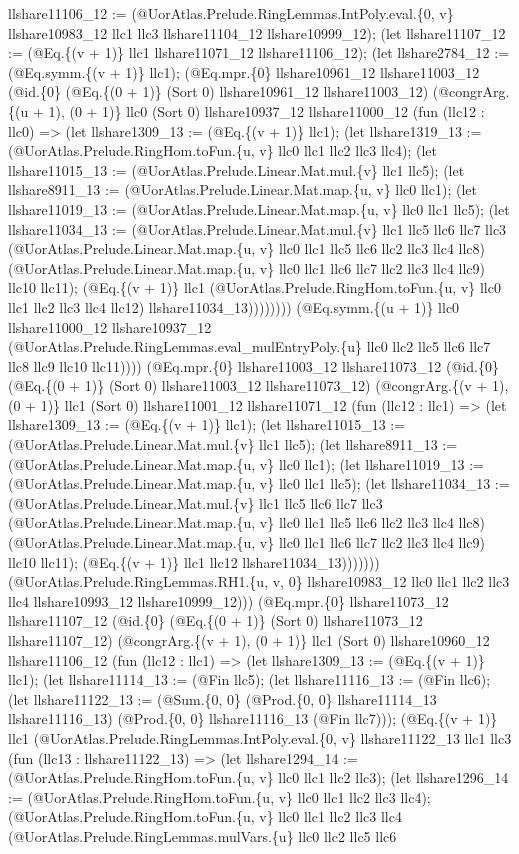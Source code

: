 \documentclass[11pt]{article}
\begin{document}
llshare11106\_12 := (@UorAtlas.Prelude.RingLemmas.IntPoly.eval.\{0, v\} llshare10983\_12 llc1 llc3 llshare11104\_12 llshare10999\_12); (let llshare11107\_12 := (@Eq.\{(v + 1)\} llc1 llshare11071\_12 llshare11106\_12); (let llshare2784\_12 := (@Eq.symm.\{(v + 1)\} llc1); (@Eq.mpr.\{0\} llshare10961\_12 llshare11003\_12 (@id.\{0\} (@Eq.\{(0 + 1)\} (Sort 0) llshare10961\_12 llshare11003\_12) (@congrArg.\{(u + 1), (0 + 1)\} llc0 (Sort 0) llshare10937\_12 llshare11000\_12 (fun (llc12 : llc0) => (let llshare1309\_13 := (@Eq.\{(v + 1)\} llc1); (let llshare1319\_13 := (@UorAtlas.Prelude.RingHom.toFun.\{u, v\} llc0 llc1 llc2 llc3 llc4); (let llshare11015\_13 := (@UorAtlas.Prelude.Linear.Mat.mul.\{v\} llc1 llc5); (let llshare8911\_13 := (@UorAtlas.Prelude.Linear.Mat.map.\{u, v\} llc0 llc1); (let llshare11019\_13 := (@UorAtlas.Prelude.Linear.Mat.map.\{u, v\} llc0 llc1 llc5); (let llshare11034\_13 := (@UorAtlas.Prelude.Linear.Mat.mul.\{v\} llc1 llc5 llc6 llc7 llc3 (@UorAtlas.Prelude.Linear.Mat.map.\{u, v\} llc0 llc1 llc5 llc6 llc2 llc3 llc4 llc8) (@UorAtlas.Prelude.Linear.Mat.map.\{u, v\} llc0 llc1 llc6 llc7 llc2 llc3 llc4 llc9) llc10 llc11); (@Eq.\{(v + 1)\} llc1 (@UorAtlas.Prelude.RingHom.toFun.\{u, v\} llc0 llc1 llc2 llc3 llc4 llc12) llshare11034\_13)))))))) (@Eq.symm.\{(u + 1)\} llc0 llshare11000\_12 llshare10937\_12 (@UorAtlas.Prelude.RingLemmas.eval\_mulEntryPoly.\{u\} llc0 llc2 llc5 llc6 llc7 llc8 llc9 llc10 llc11)))) (@Eq.mpr.\{0\} llshare11003\_12 llshare11073\_12 (@id.\{0\} (@Eq.\{(0 + 1)\} (Sort 0) llshare11003\_12 llshare11073\_12) (@congrArg.\{(v + 1), (0 + 1)\} llc1 (Sort 0) llshare11001\_12 llshare11071\_12 (fun (llc12 : llc1) => (let llshare1309\_13 := (@Eq.\{(v + 1)\} llc1); (let llshare11015\_13 := (@UorAtlas.Prelude.Linear.Mat.mul.\{v\} llc1 llc5); (let llshare8911\_13 := (@UorAtlas.Prelude.Linear.Mat.map.\{u, v\} llc0 llc1); (let llshare11019\_13 := (@UorAtlas.Prelude.Linear.Mat.map.\{u, v\} llc0 llc1 llc5); (let llshare11034\_13 := (@UorAtlas.Prelude.Linear.Mat.mul.\{v\} llc1 llc5 llc6 llc7 llc3 (@UorAtlas.Prelude.Linear.Mat.map.\{u, v\} llc0 llc1 llc5 llc6 llc2 llc3 llc4 llc8) (@UorAtlas.Prelude.Linear.Mat.map.\{u, v\} llc0 llc1 llc6 llc7 llc2 llc3 llc4 llc9) llc10 llc11); (@Eq.\{(v + 1)\} llc1 llc12 llshare11034\_13))))))) (@UorAtlas.Prelude.RingLemmas.RH1.\{u, v, 0\} llshare10983\_12 llc0 llc1 llc2 llc3 llc4 llshare10993\_12 llshare10999\_12))) (@Eq.mpr.\{0\} llshare11073\_12 llshare11107\_12 (@id.\{0\} (@Eq.\{(0 + 1)\} (Sort 0) llshare11073\_12 llshare11107\_12) (@congrArg.\{(v + 1), (0 + 1)\} llc1 (Sort 0) llshare10960\_12 llshare11106\_12 (fun (llc12 : llc1) => (let llshare1309\_13 := (@Eq.\{(v + 1)\} llc1); (let llshare11114\_13 := (@Fin llc5); (let llshare11116\_13 := (@Fin llc6); (let llshare11122\_13 := (@Sum.\{0, 0\} (@Prod.\{0, 0\} llshare11114\_13 llshare11116\_13) (@Prod.\{0, 0\} llshare11116\_13 (@Fin llc7))); (@Eq.\{(v + 1)\} llc1 (@UorAtlas.Prelude.RingLemmas.IntPoly.eval.\{0, v\} llshare11122\_13 llc1 llc3 (fun (llc13 : llshare11122\_13) => (let llshare1294\_14 := (@UorAtlas.Prelude.RingHom.toFun.\{u, v\} llc0 llc1 llc2 llc3); (let llshare1296\_14 := (@UorAtlas.Prelude.RingHom.toFun.\{u, v\} llc0 llc1 llc2 llc3 llc4); (@UorAtlas.Prelude.RingHom.toFun.\{u, v\} llc0 llc1 llc2 llc3 llc4 (@UorAtlas.Prelude.RingLemmas.mulVars.\{u\} llc0 llc2 llc5 llc6 
\end{document}
